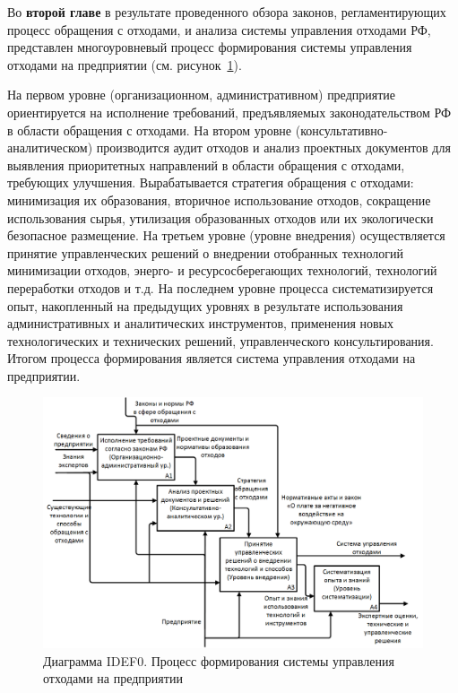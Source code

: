 \documentclass[a4paper]{G2-105}
\begin{document}
Во \textbf{второй главе} в результате проведенного обзора законов, регламентирующих процесс обращения с отходами, и анализа системы управления отходами РФ, представлен многоуровневый процесс формирования системы управления отходами на предприятии (см. рисунок~\ref{fig:as_is}).

На первом уровне (организационном, административном) предприятие ориентируется на исполнение требований, предъявляемых законодательством РФ в области обращения с отходами.
На втором уровне (консультативно-аналитическом) производится аудит отходов и анализ проектных документов для выявления приоритетных направлений в области обращения с отходами, требующих улучшения. Вырабатывается стратегия обращения с отходами: минимизация их образования, вторичное использование отходов, сокращение использования сырья, утилизация образованных отходов или их экологически безопасное размещение. На третьем уровне (уровне внедрения) осуществляется принятие управленческих решений о внедрении отобранных технологий минимизации отходов, энерго- и ресурсосберегающих технологий, технологий переработки отходов и т.д. На последнем уровне процесса систематизируется опыт, накопленный на предыдущих уровнях в результате использования административных и аналитических инструментов, применения новых технологических и технических решений, управленческого консультирования. Итогом процесса формирования является система управления отходами на предприятии.

\begin{figure}[H]
\centering
\includegraphics[scale=0.6]{as_is}
\caption{Диаграмма IDEF0. Процесс формирования системы управления отходами на предприятии}
\label{fig:as_is}
\end{figure}
\end{document}
